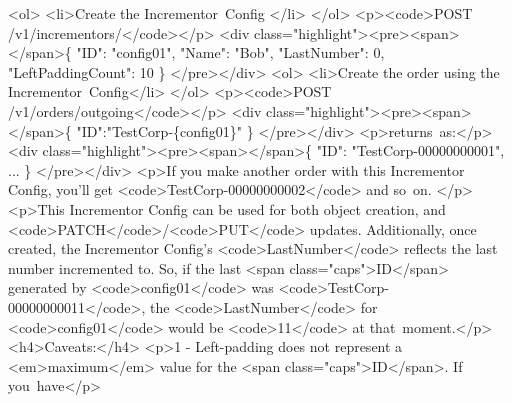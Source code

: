 \documentclass{memoir}%
\begin{document}
<ol>\newline%
<li>Create the Incrementor~Config </li>\newline%
</ol>\newline%
<p><code>POST /v1/incrementors/</code></p>\newline%
<div class="highlight"><pre><span></span>\{\newline%
  "ID": "config01",\newline%
  "Name": "Bob",\newline%
  "LastNumber": 0,\newline%
  "LeftPaddingCount": 10 \newline%
\}\newline%
</pre></div>\newline%
<ol>\newline%
<li>Create the order using the Incrementor~Config</li>\newline%
</ol>\newline%
<p><code>POST /v1/orders/outgoing</code></p>\newline%
<div class="highlight"><pre><span></span>\{\newline%
    "ID":"TestCorp{-}\{config01\}"\newline%
\}\newline%
</pre></div>\newline%
<p>returns~as:</p>\newline%
<div class="highlight"><pre><span></span>\{\newline%
  "ID": "TestCorp{-}00000000001",\newline%
...\newline%
\}\newline%
</pre></div>\newline%
<p>If you make another order with this Incrementor Config, you’ll get <code>TestCorp{-}00000000002</code> and so~on. </p>\newline%
<p>This Incrementor Config can be used for both object creation, and <code>PATCH</code>/<code>PUT</code> updates. Additionally, once created, the Incrementor Config’s <code>LastNumber</code> reflects the last number incremented to. So, if the last <span class="caps">ID</span> generated by <code>config01</code> was <code>TestCorp{-}00000000011</code>, the <code>LastNumber</code> for <code>config01</code> would be <code>11</code> at that~moment.</p>\newline%
<h4>Caveats:</h4>\newline%
<p>1 {-} Left{-}padding does not represent a <em>maximum</em> value for the <span class="caps">ID</span>. If you~have</p>\newline%
\end{document}
